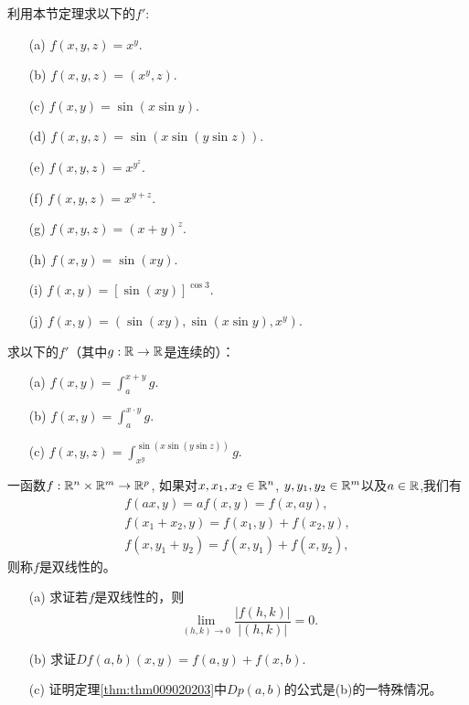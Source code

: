 \begin{problemset}
\item 利用本节定理求以下的$f'$:
\begin{enumerate}
\item[(a)] $f(x, y, z) = x^y$.
\item[(b)] $f(x, y, z) = (x^y, z)$.
\item[(c)] $f(x, y) = \sin(x\sin{y})$.
\item[(d)] $f(x, y, z) = \sin(x\sin(y\sin{z}))$.
\item[(e)] $f(x, y, z) = x^{y^z}$.
\item[(f)] $f(x, y, z) = x^{y+z}$.
\item[(g)] $f(x, y, z) = (x + y)^z$.
\item[(h)] $f(x, y) = \sin(xy)$.
\item[(i)] $f(x, y) = [\sin(xy)]^{\cos{3}}$.
\item[(j)] $f(x, y) = (\sin(xy), \sin(x\sin{y}), x^y)$.
\end{enumerate}

\item 求以下的$f'$（其中$g:\mathbb{R} \to \mathbb{R}$是连续的）：
\begin{enumerate}
\item[(a)] $f(x, y) = \int_{a}^{x+y}{g}$.
\item[(b)] $f(x, y) = \int_{a}^{x \cdot y}{g}$.
\item[(c)] $f(x, y, z) = \int_{x^y}^{\sin(x\sin(y\sin{z}))}{g}$.
\end{enumerate}

\item 一函数$f: \mathbb{R}^n \times \mathbb{R}^m \to \mathbb{R}^p$, 如果对$x,x_1,x_2 \in \mathbb{R}^n$, $y, y_1, y_2 \in \mathbb{R}^m$以及$a \in \mathbb{R}$,我们有
\begin{gather*}
f(ax, y) = af(x,y) = f(x, ay),\\
f(x_1 + x_2, y) = f(x_1, y) + f(x_2, y),\\
f(x, y_1+y_2) = f(x, y_1) + f(x, y_2),
\end{gather*}
则称$f$是双线性的。
\begin{enumerate}
\item[(a)] 求证若$f$是双线性的，则
\[
\lim_{(h, k) \to 0}{\frac{|f(h, k)|}{|(h, k)|}} = 0.
\]

\item[(b)]求证$Df(a, b)(x, y) = f(a, y) + f(x, b)$.

\item[(c)]证明定理\ref{thm:thm009020203}中$Dp(a, b)$的公式是(b)的一特殊情况。
\end{enumerate}


\end{problemset}
